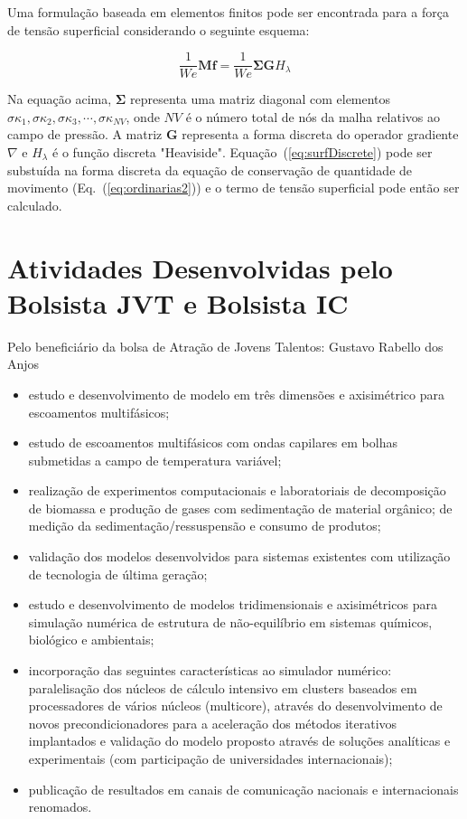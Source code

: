 \documentclass[a4paper,portuges]{article}
\newcommand{\fvet}{\mathbf{f}}
\begin{document}
Uma formulação baseada em elementos finitos pode ser encontrada para a
força de tensão superficial considerando o seguinte esquema: 

\begin{equation}
	\frac{1}{We}\mathbf{M} \fvet 
	= 
	\frac{1}{We} \mathbf{\Sigma} \mathbf{G} H_{\lambda}
	\label{eq:surfDiscrete}
\end{equation}

Na equação acima, $\mathbf{\Sigma}$ representa uma matriz diagonal com
elementos $\sigma \kappa_1, \sigma \kappa_2, \sigma \kappa_3,\cdots,
\sigma \kappa_{NV}$, onde $NV$ é o número total de nós da malha
relativos ao campo de pressão. A matriz $\mathbf{G}$ representa a forma
discreta do operador gradiente $\nabla$ e $H_{\lambda}$ é o função
discreta "Heaviside". Equação~(\ref{eq:surfDiscrete})
pode ser substuída na forma discreta da equação de conservação de
quantidade de movimento (Eq.~(\ref{eq:ordinarias2})) e o termo de tensão
superficial pode então ser calculado. 

\section{Atividades Desenvolvidas pelo Bolsista JVT e Bolsista IC}

Pelo beneficiário da bolsa de Atração de Jovens Talentos: Gustavo Rabello
dos Anjos
\begin{itemize}
\item estudo e desenvolvimento de modelo em três dimensões e axisimétrico
para escoamentos multifásicos;
\item estudo de escoamentos multifásicos com ondas capilares em bolhas
submetidas a campo de temperatura variável;
\item realização de experimentos computacionais e laboratoriais de
decomposição de biomassa e produção de gases com sedimentação de
material orgânico; de medição da sedimentação/ressuspensão e consumo de
produtos;
\item validação dos modelos desenvolvidos para sistemas existentes com
utilização de tecnologia de última geração;
\item estudo e desenvolvimento de modelos tridimensionais e axisimétricos
para simulação numérica de estrutura de não-equilíbrio em sistemas
químicos, biológico e ambientais;
\item incorporação das seguintes características ao simulador numérico:
paralelisação dos núcleos de cálculo intensivo em clusters baseados em
processadores de vários núcleos (multicore), através do desenvolvimento
de novos precondicionadores para a aceleração dos métodos iterativos
implantados e validação do modelo proposto através de soluções
analíticas e experimentais (com participação de universidades
internacionais);
\item publicação de resultados em canais de comunicação nacionais e
internacionais renomados.
\end{itemize}
\end{document}
